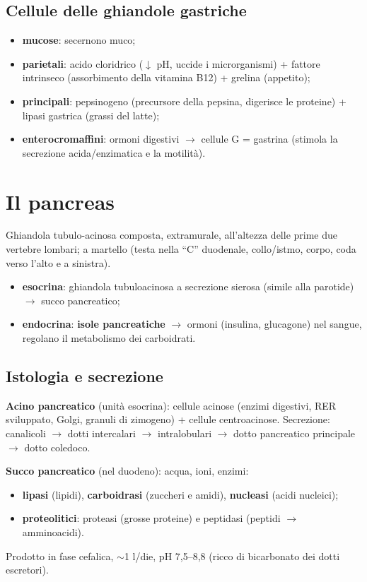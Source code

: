 \subsection{Cellule delle ghiandole gastriche}
\begin{itemize}
  \item \textbf{mucose}: secernono muco;
  \item \textbf{parietali}: acido cloridrico ($\downarrow$ pH, uccide i microrganismi) + fattore
    intrinseco (assorbimento della vitamina B12) + grelina (appetito);
  \item \textbf{principali}: pepsinogeno (precursore della pepsina, digerisce le proteine) + lipasi
    gastrica (grassi del latte);
  \item \textbf{enterocromaffini}: ormoni digestivi $\rightarrow$ cellule G = gastrina (stimola la
    secrezione acida/enzimatica e la motilità).
\end{itemize}

\section{Il pancreas}

Ghiandola tubulo-acinosa composta, extramurale, all'altezza delle prime due vertebre lombari; a
martello (testa nella ``C'' duodenale, collo/istmo, corpo, coda verso l'alto e a sinistra).
\begin{itemize}
  \item \textbf{esocrina}: ghiandola tubuloacinosa a secrezione sierosa (simile alla parotide)
    $\rightarrow$ succo pancreatico;
  \item \textbf{endocrina}: \textbf{isole pancreatiche} $\rightarrow$ ormoni (insulina, glucagone)
    nel sangue, regolano il metabolismo dei carboidrati.
\end{itemize}

\subsection{Istologia e secrezione}
\textbf{Acino pancreatico} (unità esocrina): cellule acinose (enzimi digestivi, RER sviluppato, Golgi,
granuli di zimogeno) + cellule centroacinose. Secrezione: canalicoli $\rightarrow$ dotti intercalari
$\rightarrow$ intralobulari $\rightarrow$ dotto pancreatico principale $\rightarrow$ dotto coledoco.

\textbf{Succo pancreatico} (nel duodeno): acqua, ioni, enzimi:
\begin{itemize}
  \item \textbf{lipasi} (lipidi), \textbf{carboidrasi} (zuccheri e amidi), \textbf{nucleasi} (acidi
    nucleici);
  \item \textbf{proteolitici}: proteasi (grosse proteine) e peptidasi (peptidi $\rightarrow$
    amminoacidi).
\end{itemize}
Prodotto in fase cefalica, $\sim$1 l/die, pH 7,5--8,8 (ricco di bicarbonato dei dotti escretori).

